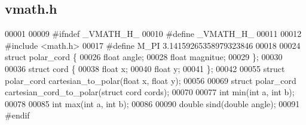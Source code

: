 \subsection{vmath.\+h}
\label{vmath_8h_source}

\begin{DoxyCode}
00001 
00009 \textcolor{preprocessor}{#ifndef \_VMATH\_H\_}
00010 \textcolor{preprocessor}{#define \_VMATH\_H\_}
00011 
00012 \textcolor{preprocessor}{#include <math.h>}
00017 \textcolor{preprocessor}{#define M\_PI 3.14159265358979323846}
00018 
00024 \textcolor{keyword}{struct }polar_cord \{
00026   \textcolor{keywordtype}{float} angle;
00028   \textcolor{keywordtype}{float} magnitue;
00029 \};
00030 
00036 \textcolor{keyword}{struct }cord \{
00038   \textcolor{keywordtype}{float} x;
00040   \textcolor{keywordtype}{float} y;
00041 \};
00042 
00055 \textcolor{keyword}{struct }polar_cord cartesian_to_polar(float x, float y);
00056 
00069 \textcolor{keyword}{struct }polar_cord cartesian_cord_to_polar(struct cord cords);
00070 
00077 \textcolor{keywordtype}{int} min(\textcolor{keywordtype}{int} a, \textcolor{keywordtype}{int} b);
00078 
00085 \textcolor{keywordtype}{int} max(\textcolor{keywordtype}{int} a, \textcolor{keywordtype}{int} b);
00086 
00090 \textcolor{keywordtype}{double} sind(\textcolor{keywordtype}{double} angle);
00091 \textcolor{preprocessor}{#endif}
\end{DoxyCode}
